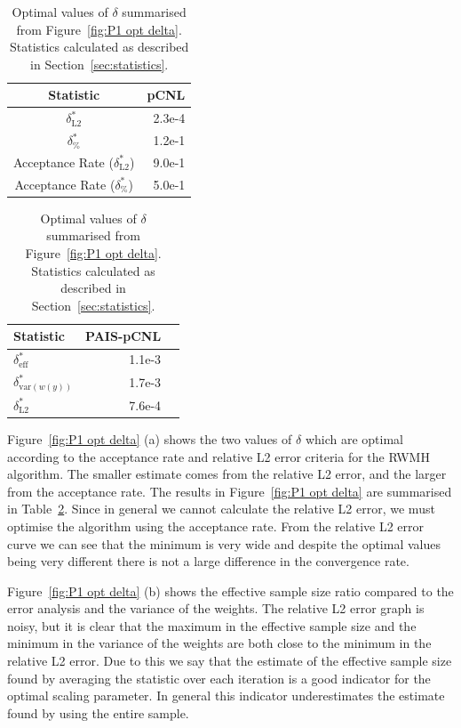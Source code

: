 \documentclass[final]{siamltex}
\begin{document}
\begin{table}[!htb]
    \begin{minipage}{.5\linewidth}
      \centering
        \begin{tabular}{|c|r|}
	\hline
	Statistic											& pCNL \\ \hline
	$\delta_{\text{L2}}^*$								& 2.3e-4 \\
	$\delta_{\%}^*$									& 1.2e-1 \\
	Acceptance Rate ($\delta_{\text{L2}}^*$)				& 9.0e-1 \\
	Acceptance Rate ($\delta_{\%}^*$)					& 5.0e-1 \\
	\hline
	\end{tabular}
    \end{minipage}%
    \begin{minipage}{.5\linewidth}
      \centering
        \begin{tabular}{|l|r|r|}
	\hline
	Statistic							& PAIS-pCNL \\ \hline
	$\delta_{\text{eff}}^*$				& 1.1e-3 \\
	$\delta_{\text{var}(w(y))}^*$			& 1.7e-3 \\
	$\delta_{\text{L2}}^*$				& 7.6e-4 \\
	\hline
	\end{tabular}
    \end{minipage}
	\vspace{1mm}
	\caption{Optimal values of $\delta$ summarised from Figure~\ref{fig:P1 opt delta}. Statistics calculated as described in Section~\ref{sec:statistics}.}
	\label{table:prob1 opt delta}
\end{table}

Figure~\ref{fig:P1 opt delta} (a) shows the two values of $\delta$ which are optimal according to the acceptance rate and relative L2 error criteria for the RWMH algorithm. The smaller estimate comes from the relative L2 error, and the larger from the acceptance rate. The results in Figure~\ref{fig:P1 opt delta} are summarised in Table~\ref{table:prob1 opt delta}. Since in general we cannot calculate the relative L2 error, we must optimise the algorithm using the acceptance rate. From the relative L2 error curve we can see that the minimum is very wide and despite the optimal values being very different there is not a large difference in the convergence rate.

Figure~\ref{fig:P1 opt delta} (b) shows the effective sample size ratio compared to the error analysis and the variance of the weights. The relative L2 error graph is noisy, but it is clear that the maximum in the effective sample size and the minimum in the variance of the weights are both close to the minimum in the relative L2 error. Due to this we say that the estimate of the effective sample size found by averaging the statistic over each iteration is a good indicator for the optimal scaling parameter. In general this indicator underestimates the estimate found by using the entire sample.
\end{document}
